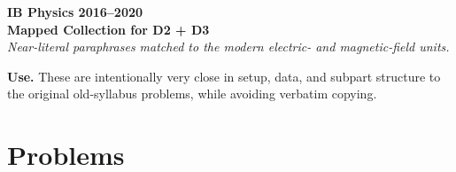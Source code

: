 \documentclass[11pt]{article}
\begin{document}
\begin{center}
{\LARGE \textbf{IB Physics 2016--2020}}\\
{\large \textbf{Mapped Collection for D2 + D3}}\\
\vspace{0.3em}
\textit{Near-literal paraphrases matched to the modern electric- and magnetic-field units.}
\end{center}

\textbf{Use.} These are intentionally very close in setup, data, and subpart structure to the original old-syllabus problems, while avoiding verbatim copying.

\section*{Problems}
\end{document}
